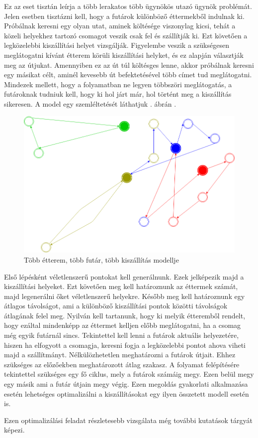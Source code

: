 

Ez az eset tisztán leírja a több lerakatos több ügynökös utazó ügynök problémát. Jelen esetben tisztázni kell, hogy a futárok különböző éttermekből indulnak ki. Próbálnak keresni egy olyan utat, aminek költésége viszonylag kicsi, tehát a közeli helyekhez tartozó csomagot veszik csak fel és szállítják ki. Ezt követően a legközelebbi kiszállítási helyet vizsgálják. Figyelembe veszik a szükségesen meglátogatni kívánt étterem körüli kiszállítási helyket, és ez alapján választják meg az útjukat. Amennyiben ez az út túl költésges lenne, akkor próbálnak keresni egy másikat célt, aminél kevesebb út befektetésével több címet tud meglátogatni. Mindezek mellett, hogy a folyamatban ne legyen többszöri meglátogatás, a futároknak tudniuk kell, hogy ki hol járt már, hol történt meg a kiszállítás sikeresen.
A model egy szemléltetését láthatjuk . ábrán \cite{Diagrams.net}.

\begin{figure}[h!]
\centering
\includegraphics[scale=0.45]{images/model5.png}
\caption{Több étterem, több futár, több kiszállítás modellje}
\label{fig:model5}
\end{figure}


Első lépésként véletlenszerű pontokat kell generálnunk. Ezek jelképezik majd a kiszállítási helyeket. Ezt követően meg kell határoznunk az éttermek számát, majd legenerálni őket véletlenszerű helyekre. Később meg kell határoznunk egy átlagos távolságot, ami a különböző kiszállítási pontok közötti távolságok átlagának felel meg. Nyilván kell tartanunk, hogy ki melyik étteremből rendelt, hogy ezáltal mindenképp az éttermet kelljen előbb meglátogatni, ha a csomag még egyik futárnál sincs. Tekintettel kell lenni a futárok aktuális helyezetére, hiszen ha elfogyott a csomagja, keresni fogja a legközelebbi pontot ahova viheti majd a szállítmányt. Nélkülözhetetlen meghatározni a futárok útjait. Ehhez szükséges az előzőekben meghatározott átlag szakasz. A folyamat felépítésére tekintettel szükséges egy fő ciklus, mely a futárok számáig megy. Ezen belül megy egy másik ami a futár útjain megy végig. Ezen megoldás gyakorlati alkalmazása esetén lehetséges optimalizálni a kiszállításokat egy ilyen összetett modell esetén is.

Ezen optimalizálási feladat részletesebb vizsgálata még további kutatások tárgyát képezi.
